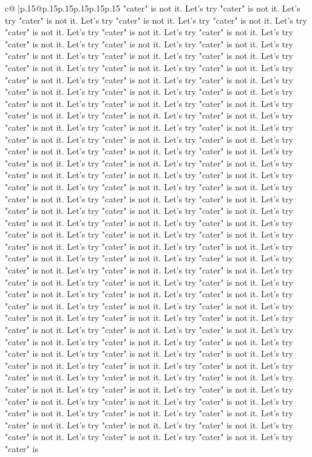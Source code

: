 \documentclass{article}
\begin{document}
{\begin{supertabular}{c@{$\;$}|p{.15\linewidth}@{}p{.15\linewidth}p{.15\linewidth}p{.15\linewidth}p{.15\linewidth}p{.15\linewidth}}
{{{"cater" is not it. Let's try "cater" is not it. Let's try "cater" is not it. Let's try "cater" is not it. Let's try "cater" is not it. Let's try "cater" is not it. Let's try "cater" is not it. Let's try "cater" is not it. Let's try "cater" is not it. Let's try "cater" is not it. Let's try "cater" is not it. Let's try "cater" is not it. Let's try "cater" is not it. Let's try "cater" is not it. Let's try "cater" is not it. Let's try "cater" is not it. Let's try "cater" is not it. Let's try "cater" is not it. Let's try "cater" is not it. Let's try "cater" is not it. Let's try "cater" is not it. Let's try "cater" is not it. Let's try "cater" is not it. Let's try "cater" is not it. Let's try "cater" is not it. Let's try "cater" is not it. Let's try "cater" is not it. Let's try "cater" is not it. Let's try "cater" is not it. Let's try "cater" is not it. Let's try "cater" is not it. Let's try "cater" is not it. Let's try "cater" is not it. Let's try "cater" is not it. Let's try "cater" is not it. Let's try "cater" is not it. Let's try "cater" is not it. Let's try "cater" is not it. Let's try "cater" is not it. Let's try "cater" is not it. Let's try "cater" is not it. Let's try "cater" is not it. Let's try "cater" is not it. Let's try "cater" is not it. Let's try "cater" is not it. Let's try "cater" is not it. Let's try "cater" is not it. Let's try "cater" is not it. Let's try "cater" is not it. Let's try "cater" is not it. Let's try "cater" is not it. Let's try "cater" is not it. Let's try "cater" is not it. Let's try "cater" is not it. Let's try "cater" is not it. Let's try "cater" is not it. Let's try "cater" is not it. Let's try "cater" is not it. Let's try "cater" is not it. Let's try "cater" is not it. Let's try "cater" is not it. Let's try "cater" is not it. Let's try "cater" is not it. Let's try "cater" is not it. Let's try "cater" is not it. Let's try "cater" is not it. Let's try "cater" is not it. Let's try "cater" is not it. Let's try "cater" is not it. Let's try "cater" is not it. Let's try "cater" is not it. Let's try "cater" is not it. Let's try "cater" is not it. Let's try "cater" is not it. Let's try "cater" is not it. Let's try "cater" is not it. Let's try "cater" is not it. Let's try "cater" is not it. Let's try "cater" is not it. Let's try "cater" is not it. Let's try "cater" is not it. Let's try "cater" is not it. Let's try "cater" is not it. Let's try "cater" is not it. Let's try "cater" is not it. Let's try "cater" is not it. Let's try "cater" is not it. Let's try "cater" is not it. Let's try "cater" is not it. Let's try "cater" is not it. Let's try "cater" is not it. Let's try "cater" is not it. Let's try "cater" is not it. Let's try "cater" is not it. Let's try "cater" is not it. Let's try "cater" is not it. Let's try "cater" is not it. Let's try "cater" is not it. Let's try "cater" is not it. Let's try "cater" is not it. Let's try "cater" is not it. Let's try "cater" is not it. Let's try "cater" is not it. Let's try "cater" is not it. Let's try "cater" is not it. Let's try "cater" is not it. Let's try "cater" is not it. Let's try "cater" is not it. Let's try "cater" is not it. Let's try "cater" is not it. Let's try "cater" is }}}
\end{supertabular}}
\end{document}
